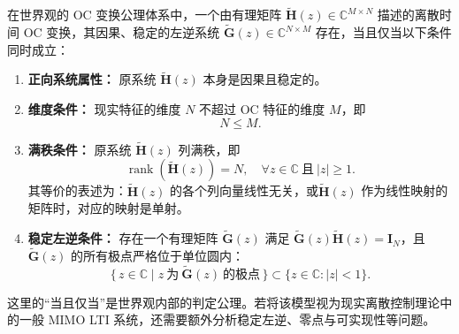 \begin{theorem}
    \label{the:inv-disc-existence}
    在\wkn{}世界观的 OC 变换公理体系中，一个由有理矩阵 $\tilde{\mathbf{H}}(z)\in\mathbb{C}^{M \times N}$ 描述的离散时间 OC 变换，其因果、稳定的左逆系统 $\tilde{\mathbf{G}}(z)\in\mathbb{C}^{N \times M}$ 存在，当且仅当以下条件同时成立：

    \begin{enumerate}
        \item \textbf{正向系统属性：} 原系统 $\tilde{\mathbf{H}}(z)$ 本身是因果且稳定的。

        \item \textbf{维度条件：} 现实特征的维度 $N$ 不超过 OC 特征的维度 $M$，即
              \begin{equation}
                  N \leq M.
              \end{equation}

        \item \textbf{满秩条件：} 原系统 $\tilde{\mathbf{H}}(z)$ 列满秩，即
              \begin{equation}
                  \operatorname{rank}(\tilde{\mathbf{H}}(z)) = N,\quad \forall z\in\mathbb{C}\ \text{且}\ |z|\geq 1.
              \end{equation}
              其等价的表述为：$\tilde{\mathbf{H}}(z)$ 的各个列向量线性无关，或$\tilde{\mathbf{H}}(z)$ 作为线性映射的矩阵时，对应的映射是单射。

        \item \textbf{稳定左逆条件：} 存在一个有理矩阵 $\tilde{\mathbf{G}}(z)$ 满足 $\tilde{\mathbf{G}}(z)\tilde{\mathbf{H}}(z)=\mathbf{I}_N$，且 $\tilde{\mathbf{G}}(z)$ 的所有极点严格位于单位圆内：
              \begin{equation}
                  \{\,z\in\mathbb{C}\mid z\ \text{为}\ \tilde{\mathbf{G}}(z)\ \text{的极点}\,\}
                  \subset
                  \{z\in\mathbb{C}:|z|<1\}.
              \end{equation}
    \end{enumerate}
\end{theorem}

\begin{remark}
    这里的“当且仅当”是\wkn{}世界观内部的判定公理。若将该模型视为现实离散控制理论中的一般 MIMO LTI 系统，还需要额外分析稳定左逆、零点与可实现性等问题。
\end{remark}

